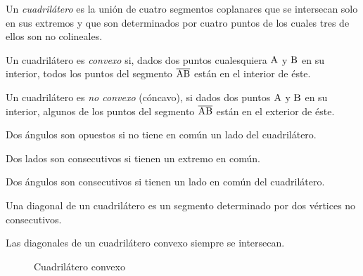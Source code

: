 
\begin{definition}
Un \textit{cuadrilátero} es la unión de cuatro segmentos coplanares que se intersecan solo en sus extremos y que son determinados por cuatro puntos de los cuales tres de ellos son no colineales.
\end{definition}

\begin{definition}
    Un cuadrilátero es \textit{convexo} si, dados dos puntos cualesquiera $\rm A$ y $\rm B$ en su interior, todos los puntos del segmento $\overline{\rm AB}$ están en el interior de éste.
\end{definition}

\begin{definition}
    Un cuadrilátero es \textit{no convexo} (cóncavo), si dados dos puntos $\rm A$ y $\rm B$ en su interior, algunos de los puntos del segmento $\overline{\rm AB}$ están en el exterior de éste.
\end{definition}

\begin{definition}
    Dos ángulos son opuestos si no tiene en común un lado del cuadrilátero.
\end{definition}

\begin{definition}
    Dos lados son consecutivos si tienen un extremo en común.
\end{definition}

\begin{definition}
    Dos ángulos son consecutivos si tienen un lado en común del cuadrilátero.
\end{definition}

\begin{definition}
    Una diagonal de un cuadrilátero es un segmento determinado por dos vértices no consecutivos.
\end{definition}

\begin{theorem}
    Las diagonales de un cuadrilátero convexo siempre se intersecan.

    \begin{figure}[!h]
        \centering
        
        \caption{Cuadrilátero convexo}
        \label{fig:theorem9}
    \end{figure}

\end{theorem}

